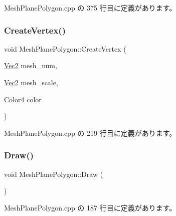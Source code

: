  Mesh\+Plane\+Polygon.\+cpp の 375 行目に定義があります。

\mbox{\label{class_mesh_plane_polygon_a50cdb56a3faa5d0bbb8ff75c3dcc2830}} 
\subsubsection{\texorpdfstring{Create\+Vertex()}{CreateVertex()}}
{\footnotesize\ttfamily void Mesh\+Plane\+Polygon\+::\+Create\+Vertex (\begin{DoxyParamCaption}\item[{\mbox{\hyperlink{_vector3_d_8h_a5ef6e95dfc5f9d3820b71772d99bbc25}{Vec2}}}]{mesh\+\_\+num,  }\item[{\mbox{\hyperlink{_vector3_d_8h_a5ef6e95dfc5f9d3820b71772d99bbc25}{Vec2}}}]{mesh\+\_\+scale,  }\item[{\mbox{\hyperlink{_vector3_d_8h_a9c2339f516cf07ce4753b8a99fab3791}{Color4}}}]{color }\end{DoxyParamCaption})\hspace{0.3cm}{\ttfamily [private]}}



 Mesh\+Plane\+Polygon.\+cpp の 219 行目に定義があります。

\mbox{\label{class_mesh_plane_polygon_a813d5d6897ec0ce2b672cd6e1360e281}} 
\subsubsection{\texorpdfstring{Draw()}{Draw()}}
{\footnotesize\ttfamily void Mesh\+Plane\+Polygon\+::\+Draw (\begin{DoxyParamCaption}{ }\end{DoxyParamCaption})}



 Mesh\+Plane\+Polygon.\+cpp の 187 行目に定義があります。

\mbox{\label{class_mesh_plane_polygon_ac04d763b16a962f00c99e3354e45f320}} 
